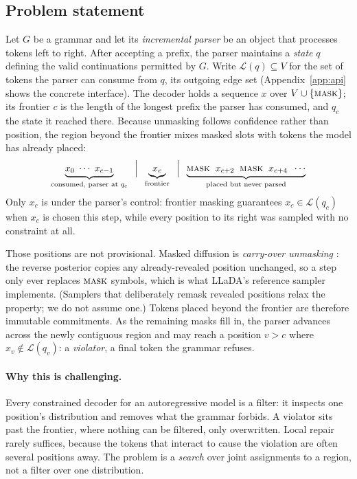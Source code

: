 \documentclass{article}
\begin{document}
\subsection{Problem statement}
\label{sec:problem}

Let $G$ be a grammar and let its \emph{incremental parser} be an object that processes tokens left to right. After accepting a prefix, the parser maintains a \emph{state} $q$ defining the valid continuations permitted by $G$. Write
$\mathcal{L}(q)\subseteq V$ for the set of tokens the parser can consume from
$q$, its outgoing edge set (Appendix~\ref{app:api} shows the concrete interface). The decoder holds a sequence $x$ over
$V\cup\{\textsc{mask}\}$; its frontier $c$ is the length of the longest
prefix the parser has consumed, and $q_c$ the state it reached there. 
Because unmasking follows confidence rather than position, the region beyond the frontier mixes masked slots with tokens the model has already placed:
\[
\underbrace{x_0\;\cdots\;x_{c-1}}_{\text{consumed, parser at }q_c}
\;\;\Big|\;\;
\underbrace{x_c}_{\text{frontier}}
\;\;\Big|\;\;
\underbrace{\textsc{mask}\;\;x_{c+2}\;\;\textsc{mask}\;\;x_{c+4}\;\;\cdots}_{\text{placed but never parsed}}
\]
Only $x_c$ is under the parser's control: frontier masking guarantees
$x_c\in\mathcal{L}(q_c)$ when $x_c$ is chosen this step, while every position to
its right was sampled with no constraint at all.

Those positions are not provisional. Masked diffusion is \emph{carry-over
unmasking} \citep{sahoo2024simple,shi2024simplified}: the reverse posterior
copies any already-revealed position unchanged, so a step only ever replaces
$\textsc{mask}$ symbols, which is what LLaDA's reference sampler implements. (Samplers that deliberately
remask revealed positions relax the property; we do not assume one.) Tokens
placed beyond the frontier are therefore immutable commitments. As the remaining
masks fill in, the parser advances across the newly contiguous region and may
reach a position $v>c$ where $x_v\notin\mathcal{L}(q_v)$: a \emph{violator}, a
final token the grammar refuses.

\paragraph{Why this is challenging.}
Every constrained decoder for an autoregressive model is a filter: it inspects
one position's distribution and removes what the grammar forbids. A violator sits
past the frontier, where nothing can be filtered, only overwritten.
Local repair rarely suffices, because the tokens that interact to cause the
violation are often several positions away. The problem is a \emph{search} over
joint assignments to a region, not a filter over one distribution.
\end{document}
